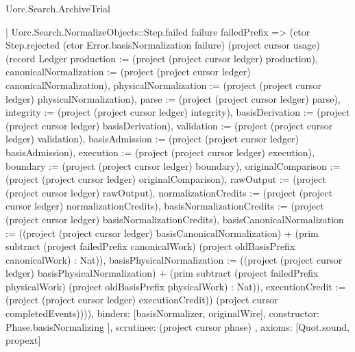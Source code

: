 \begin{lexlean}{Uorc.Search.ArchiveTrial}
\begin{semanticmodule}
{{{          | Uorc.Search.NormalizeObjects::Step.failed failure failedPrefix => (ctor Step.rejected (ctor Error.basisNormalization failure) (project cursor usage) (record Ledger {production := (project (project cursor ledger) production), canonicalNormalization := (project (project cursor ledger) canonicalNormalization), physicalNormalization := (project (project cursor ledger) physicalNormalization), parse := (project (project cursor ledger) parse), integrity := (project (project cursor ledger) integrity), basisDerivation := (project (project cursor ledger) basisDerivation), validation := (project (project cursor ledger) validation), basisAdmission := (project (project cursor ledger) basisAdmission), execution := (project (project cursor ledger) execution), boundary := (project (project cursor ledger) boundary), originalComparison := (project (project cursor ledger) originalComparison), rawOutput := (project (project cursor ledger) rawOutput), normalizationCredits := (project (project cursor ledger) normalizationCredits), basisNormalizationCredits := (project (project cursor ledger) basisNormalizationCredits), basisCanonicalNormalization := ((project (project cursor ledger) basisCanonicalNormalization) + (prim subtract (project failedPrefix canonicalWork) (project oldBasisPrefix canonicalWork) : Nat)), basisPhysicalNormalization := ((project (project cursor ledger) basisPhysicalNormalization) + (prim subtract (project failedPrefix physicalWork) (project oldBasisPrefix physicalWork) : Nat)), executionCredit := (project (project cursor ledger) executionCredit)}) (project cursor completedEvents)))),
        binders: [basisNormalizer, originalWire],
        constructor: Phase.basisNormalizing
      }
    ],
    scrutinee: (project cursor phase)
  },
  axioms: [Quot.sound, propext]
}


\end{semanticmodule}
\end{lexlean}

